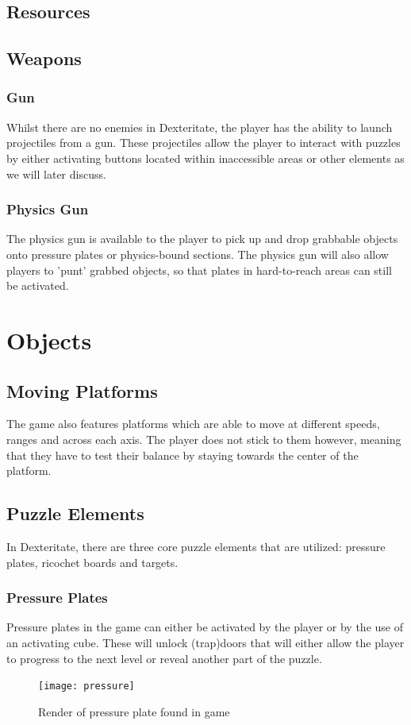 \documentclass[11pt]{article}
\begin{document}
\subsection{Resources}

\subsection{Weapons}
\subsubsection{Gun}
Whilst there are no enemies in Dexteritate, the player has the ability to launch projectiles from a gun. These projectiles allow the player to interact with puzzles by either activating buttons located within inaccessible areas or other elements as we will later discuss.

\subsubsection{Physics Gun}
The physics gun is available to the player to pick up and drop grabbable objects onto pressure plates or physics-bound sections. The physics gun will also allow players to 'punt' grabbed objects, so that plates in hard-to-reach areas can still be activated.



\section{Objects}

\subsection{Moving Platforms}
The game also features platforms which are able to move at different speeds, ranges and across each axis. The player does not stick to them however, meaning that they have to test their balance by staying towards the center of the platform. 

\subsection{Puzzle Elements}

In Dexteritate, there are three core puzzle elements that are utilized: pressure plates, ricochet boards and targets.

\subsubsection{Pressure Plates}
Pressure plates in the game can either be activated by the player or by the use of an activating cube. These will unlock (trap)doors that will either allow the player to progress to the next level or reveal another part of the puzzle.  \\
\begin{figure}[h]
\begin{center}
\texttt{[image: pressure]}
\end{center}
\caption{Render of pressure plate found in game}
\end{figure}
\end{document}
